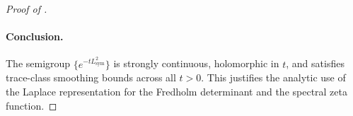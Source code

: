\begin{proof}[Proof of ]
\paragraph{Conclusion.}
The semigroup \( \{ e^{-t L_{\mathrm{sym}}^2} \} \) is strongly continuous, holomorphic in \( t \), and satisfies trace-class smoothing bounds across all \( t > 0 \). This justifies the analytic use of the Laplace representation for the Fredholm determinant and the spectral zeta function.
\end{proof}
